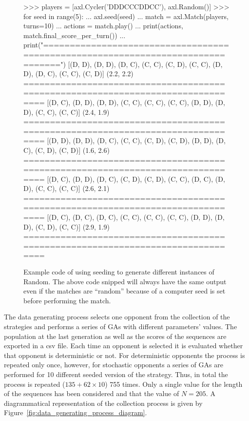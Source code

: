 \begin{figure}[!htbp]
    \begin{usagepy}
>>> players = [axl.Cycler('DDDCCCDDCC'), axl.Random()]
>>> for seed in range(5):
...   axl.seed(seed)
...   match = axl.Match(players, turns=10)
...   actions = match.play()
...   print(actions, match.final_score_per_turn())
...   print("================================================================================")
[(D, D), (D, D), (D, C), (C, C), (C, D), (C, C), (D, D), (D, C), (C, C), (C, D)] (2.2, 2.2)
================================================================================
[(D, C), (D, D), (D, D), (C, C), (C, C), (C, C), (D, D), (D, D), (C, C), (C, C)] (2.4, 1.9)
================================================================================
[(D, D), (D, D), (D, C), (C, C), (C, D), (C, D), (D, D), (D, C), (C, D), (C, D)] (1.6, 2.6)
================================================================================
[(D, C), (D, D), (D, C), (C, D), (C, D), (C, C), (D, C), (D, D), (C, C), (C, C)] (2.6, 2.1)
================================================================================
[(D, C), (D, C), (D, C), (C, C), (C, C), (C, C), (D, D), (D, D), (C, D), (C, C)] (2.9, 1.9)
================================================================================

\end{usagepy}
\caption{Example code of using seeding to generate different instances of Random.
The above code snipped will always have the same output even if the matches are
``random'' because of a computer seed is set before performing the
match.}\label{fig:random_apl_example}
\end{figure}

The data generating process selects one opponent from the collection of the
\numberofstrategiesbestsequences strategies and performs a series of GAs with
different parameters' values. The population at the last generation as well as
the scores of the sequences are exported in a csv file. Each time an opponent is
selected it is evaluated whether that opponent is deterministic or not. For
deterministic opponents the process is repeated only once, however, for
stochastic opponents a series of GAs are performed for 10 different seeded
version of the strategy. Thus, in total the process is repeated (\(135 + 62
\times 10\)) 755 times. Only a single value for the length of the
sequences has been considered and that the value of \(N=205\). A diagrammatical
representation of the collection process is given by
Figure~\ref{fig:data_generating_process_diagram}.

